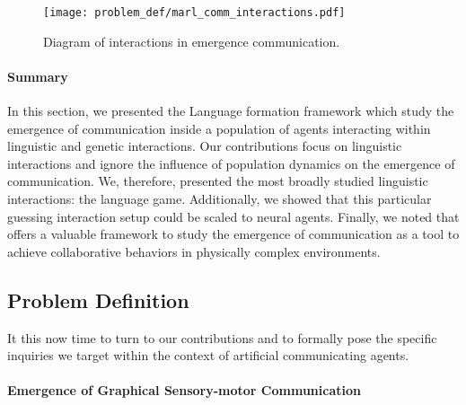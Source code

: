 \begin{figure}[!h]
\centering
\texttt{[image: problem\_def/marl\_comm\_interactions.pdf]}	
\caption{Diagram of interactions in \marl emergence communication.}
\label{fig:marl_comm_interactions}
\end{figure}


\paragraph{Summary}

In this section, we presented the Language formation framework which study the emergence of communication inside a population of agents interacting within linguistic and genetic interactions. Our contributions focus on linguistic interactions and ignore the influence of population dynamics on the emergence of communication. We, therefore, presented the most broadly studied linguistic interactions: the language game. Additionally, we showed that this particular guessing interaction setup could be scaled to neural agents. Finally, we noted that \marl offers a valuable framework to study the emergence of communication as a tool to achieve collaborative behaviors in physically complex environments. 

\subsection{Problem Definition}

\label{sec:self-orga-lang-prob-def}

It this now time to turn to our contributions and to formally pose the specific inquiries we target within the context of artificial communicating agents.

\paragraph{Emergence of Graphical Sensory-motor Communication}

